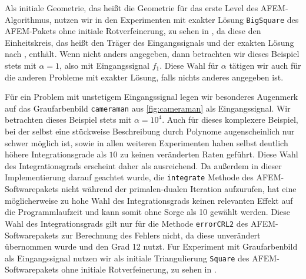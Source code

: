 Als initiale Geometrie, das heißt die Geometrie für das erste Level des
AFEM-Al\-go\-rith\-mus, nutzen wir in den Experimenten mit exakter Lösung
\texttt{BigSquare} des AFEM-Pakets ohne initiale Rotverfeinerung, zu sehen in
, da diese den Einheitskreis, das heißt den Träger
des Eingangssignals und der exakten Lösung nach
, enthält.
Wenn nicht anders angegeben, dann betrachten wir dieses Beispiel stets mit
$\alpha=1$, also mit Eingangssignal $f_1$. 
Diese Wahl für $\alpha$ tätigen wir auch für die anderen Probleme mit 
exakter Lösung, falls nichts anderes angegeben ist.

Für ein Problem mit unstetigem Eingangssignal legen wir besonderes
Augenmerk auf das Graufarbenbild \texttt{cameraman} aus \cref{fig:cameraman}
als Eingangssignal. 
Wir betrachten dieses Beispiel stets mit $\alpha=10^4$.
Auch für dieses komplexere Beispiel, bei der selbst eine stückweise
Beschreibung durch Polynome augenscheinlich nur schwer möglich ist, sowie in
allen weiteren Experimenten haben selbst deutlich höhere Integrationsgrade als
$10$ zu keinen veränderten Raten geführt. 
Diese Wahl des Integrationsgrads erscheint daher als ausreichend.
Da außerdem in dieser Implementierung darauf geachtet wurde, die
\texttt{integrate} Methode des AFEM-Softwarepakets \cite{Car09} nicht während
der primalen-dualen Iteration aufzurufen, hat eine möglicherweise zu hohe Wahl
des Integrationsgrads keinen relevanten Effekt auf die Programmlaufzeit und
kann somit ohne Sorge als 10 gewählt werden.
Diese Wahl des Integrationsgrads gilt nur für die Methode \texttt{errorCRL2}
des AFEM-Softwarepakets zur Berechnung des Fehlers nicht, da diese unverändert
übernommen wurde und den Grad 12 nutzt.
Fur Experiment mit Graufarbenbild als Eingangssignal nutzen wir als initiale
Triangulierung \texttt{Square} des AFEM-Softwarepakets ohne initiale
Rotverfeinerung, zu sehen in .

